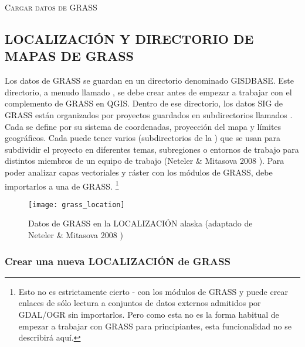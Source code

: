 \begin{Tip}\caption{\textsc{Cargar datos de GRASS}}
\end{Tip} 

\subsection{LOCALIZACIÓN Y DIRECTORIO DE MAPAS DE GRASS}\label{sec:about_loc}

Los datos de GRASS se guardan en un directorio denominado GISDBASE. Este directorio, 
a menudo llamado , 
se debe crear antes de empezar a trabajar con el complemento de GRASS en QGIS. Dentro de ese directorio, los datos SIG de GRASS están
organizados por proyectos guardados en subdirectorios llamados . 
Cada  se define 
por su sistema de coordenadas, proyección del mapa y límites geográficos. Cada  puede tener 
varios  (subdirectorios de la ) que se usan para subdividir el proyecto 
en diferentes temas, subregiones o entornos de trabajo para distintos miembros de un equipo de trabajo (Neteler \& Mitasova 2008 
\cite{neteler_mitasova08}). Para poder analizar capas vectoriales y ráster con los módulos de GRASS, debe importarlos a una  de GRASS.
\footnote{Esto no es estrictamente cierto - con los módulos de GRASS 
 y  puede crear enlaces de sólo lectura a conjuntos de datos externos admitidos por 
GDAL/OGR sin importarlos. Pero como esta no es la forma habitual de empezar a trabajar con GRASS para principiantes, esta funcionalidad no se describirá aquí.}

\begin{figure}[ht]
\begin{center}
\caption{Datos de GRASS en la LOCALIZACIÓN alaska (adaptado de Neteler \& 
Mitasova 2008 \cite{neteler_mitasova08})}\label{fig:grass_location}\smallskip
\texttt{[image: grass\_location]}
\end{center}  
\end{figure}

\subsubsection{Crear una nueva LOCALIZACIÓN de GRASS}\label{sec:create_loc}

